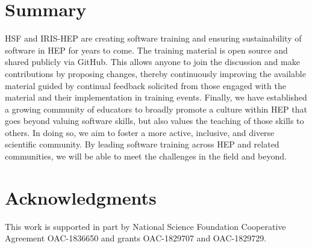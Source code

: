 \documentclass[twocolumn]{svjour3}          %
\begin{document}
\section{Summary}\label{sec:Summary}

HSF and IRIS-HEP are creating software training and ensuring sustainability of software in HEP for years to come. The training material is open source and shared publicly via GitHub. This allows anyone to join the discussion and make contributions by proposing changes, thereby continuously improving the available material guided by continual feedback solicited from those engaged with the material and their implementation in training events. Finally, we have established a growing community of educators to broadly promote a culture within HEP that goes beyond valuing software skills, but also values the teaching of those skills to others. In doing so, we aim to foster a more active, inclusive, and diverse scientific community.  By leading software training across HEP and related communities, we will be able to meet the challenges in the field and beyond.

\section*{Acknowledgments}

This work is supported in part by National Science Foundation Cooperative Agreement OAC-1836650 and grants OAC-1829707 and OAC-1829729.



\end{document}
